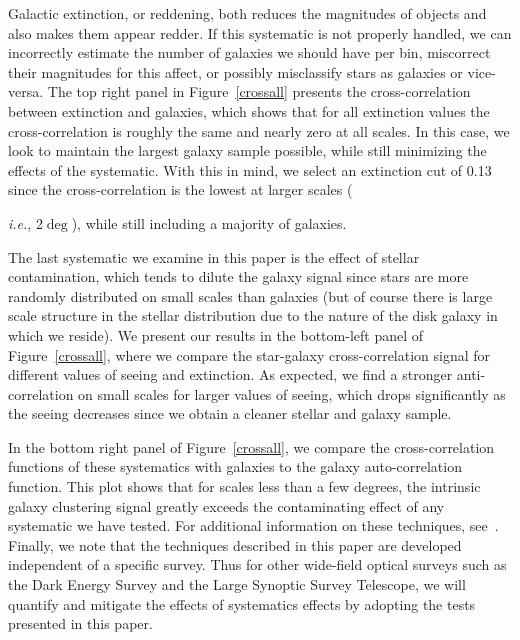 \documentclass[11pt,twoside]{article}
\begin{document}
Galactic extinction, or reddening, both reduces the magnitudes of objects and also makes them appear redder. If this systematic is not properly handled, we can incorrectly estimate the number of galaxies we should have per bin, miscorrect their magnitudes for this affect, or possibly misclassify stars as galaxies or vice-versa. The top right panel in Figure~\ref{crossall} presents the cross-correlation between extinction and galaxies, which shows that for all extinction values the cross-correlation is roughly the same and nearly zero at all scales. In this case, we look to maintain the largest galaxy sample possible, while still minimizing the effects of the systematic. With this in mind, we select an extinction cut of 0.13 since the cross-correlation is the lowest at larger scales ({\textit{i.e.}, 2$\deg$), while still including a majority of galaxies.

The last systematic we examine in this paper is the effect of stellar contamination, which tends to dilute the galaxy signal since stars are more randomly distributed on small scales than galaxies (but of course there is large scale structure in the stellar distribution due to the nature of the disk galaxy in which we reside). We present our results in the bottom-left panel of Figure~\ref{crossall}, where we compare the star-galaxy cross-correlation signal for different values of seeing and extinction. As expected, we find a stronger anti-correlation on small scales for larger values of seeing, which drops significantly as the seeing decreases since we obtain a cleaner stellar and galaxy sample. 

In the bottom right panel of Figure~\ref{crossall}, we compare the cross-correlation functions of these systematics with galaxies to the galaxy auto-correlation function. This plot shows that for scales less than a few degrees, the intrinsic galaxy clustering signal greatly exceeds the contaminating effect of any systematic we have tested. For additional information on these techniques, see~\cite{Scranton02, Ross11, Wang13}. Finally, we note that the techniques described in this paper are developed independent of a specific survey. Thus for other wide-field optical surveys such as the Dark Energy Survey and the Large Synoptic Survey Telescope, we will quantify and mitigate the effects of systematics effects by adopting the tests presented in this paper.

%
\begin{thebibliography}{}


\end{thebibliography}}
\end{document}
